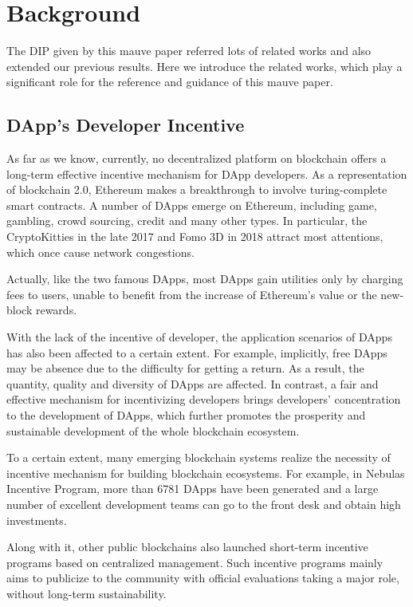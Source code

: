 \section{Background}
\label{sec:background}
The DIP given by this mauve paper referred  lots of related works and also extended our previous results. Here we introduce the related works, which play a significant role for the  reference and guidance of this mauve paper.

\subsection{DApp's Developer Incentive}
As far as we know, currently, no decentralized platform on blockchain offers a long-term effective incentive mechanism for DApp developers. As a representation of blockchain 2.0, Ethereum makes a breakthrough to involve turing-complete smart contracts. A number of DApps emerge on Ethereum, including game, gambling, crowd sourcing, credit and many other types. In particular, the CryptoKitties in the late 2017 and Fomo 3D in 2018 attract most attentions, which once cause network congestions.

Actually, like the two famous DApps, most DApps gain utilities only by charging
fees to users, unable to benefit from the increase of Ethereum's value or the
new-block rewards.

With the lack of the incentive of developer, the application scenarios of DApps
has also been affected to a certain extent. For example, implicitly, free DApps
may be absence due to the difficulty for getting a return. As a result, the
quantity, quality and diversity of DApps are affected. In contrast, a fair and
effective mechanism for incentivizing developers brings developers'
concentration to the development of DApps, which further promotes the prosperity and sustainable development of the whole blockchain ecosystem.

To a certain extent, many emerging blockchain systems realize the necessity of incentive mechanism for building blockchain ecosystems. For example, in Nebulas Incentive Program, more than 6781 DApps have been generated and a large number of excellent development teams can go to the front desk and obtain high investments.

Along with it, other public blockchains also launched short-term incentive programs based on centralized management. Such incentive programs mainly aims to publicize to the community with official evaluations taking a major role, without long-term sustainability.


